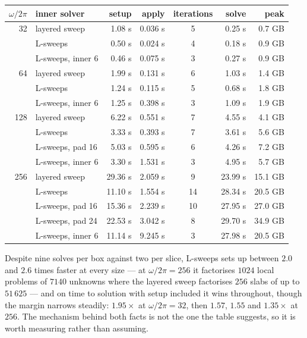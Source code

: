 \documentclass[11pt]{article}
\begin{document}
\begin{center}\footnotesize\setlength{\tabcolsep}{5pt}
\begin{tabular}{rlrrcrr}
\toprule
$\omega/2\pi$ & inner solver & setup & apply & iterations & solve & peak \\
\midrule
 32 & layered sweep      & 1.08 s & 0.036 s & 5 & 0.25 s & 0.7 GB \\
    & L-sweeps           & 0.50 s & 0.024 s & 4 & 0.18 s & 0.9 GB \\
    & L-sweeps, inner 6  & 0.46 s & 0.075 s & 3 & 0.27 s & 0.9 GB \\
 64 & layered sweep      & 1.99 s & 0.131 s & 6 & 1.03 s & 1.4 GB \\
    & L-sweeps           & 1.24 s & 0.115 s & 5 & 0.68 s & 1.8 GB \\
    & L-sweeps, inner 6  & 1.25 s & 0.398 s & 3 & 1.09 s & 1.9 GB \\
128 & layered sweep      & 6.22 s & 0.551 s & 7 & 4.55 s & 4.1 GB \\
    & L-sweeps           & 3.33 s & 0.393 s & 7 & 3.61 s & 5.6 GB \\
    & L-sweeps, pad 16   & 5.03 s & 0.595 s & 6 & 4.26 s & 7.2 GB \\
    & L-sweeps, inner 6  & 3.30 s & 1.531 s & 3 & 4.95 s & 5.7 GB \\
256 & layered sweep      & 29.36 s & 2.059 s & 9 & 23.99 s & 15.1 GB \\
    & L-sweeps           & 11.10 s & 1.554 s & 14 & 28.34 s & 20.5 GB \\
    & L-sweeps, pad 16   & 15.36 s & 2.239 s & 10 & 27.95 s & 27.0 GB \\
    & L-sweeps, pad 24   & 22.53 s & 3.042 s & 8 & 29.70 s & 34.9 GB \\
    & L-sweeps, inner 6  & 11.14 s & 9.245 s & 3 & 27.98 s & 20.5 GB \\
\bottomrule
\end{tabular}
\end{center}
Despite nine solves per box against two per slice, L-sweeps sets up between $2.0$ and
$2.6$ times faster at every size --- at $\omega/2\pi=256$ it factorises $1024$ local
problems of $7140$ unknowns where the layered sweep factorises $256$ slabs of up to
$51\,625$ --- and on time to solution with setup included it wins throughout, though the
margin narrows steadily: $1.95\times$ at $\omega/2\pi=32$, then $1.57$, $1.55$ and
$1.35\times$ at $256$. The mechanism behind both facts is not the one the table suggests,
so it is worth measuring rather than assuming.
\end{document}
